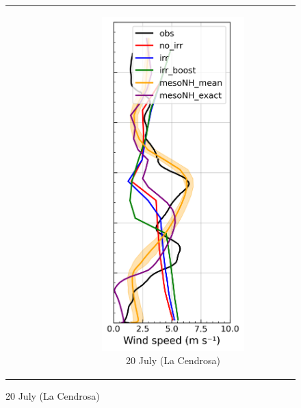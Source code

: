 \begin{figure}[hbtp]
{\begin{tabular}{@{}cccc@{}}
\begin{subfigure}[t]{0.289\textwidth}
        \end{subfigure} &
        \begin{subfigure}[t]{0.283\textwidth}
            \caption{20 July (La Cendrosa)}
            \includegraphics[width=\textwidth]{images/chap5/profiles/profile_cendrosa_wind_speed_2007_.png}

\end{subfigure}
\end{tabular}}
\end{figure}
